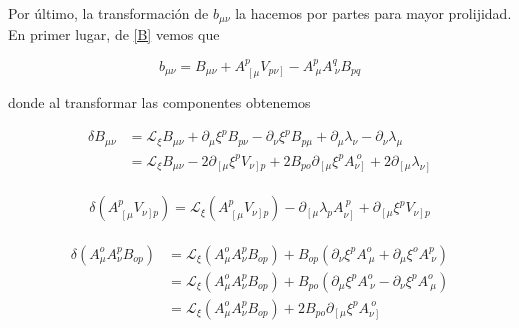 \documentclass{article}
\numberwithin{equation}{section}
\begin{document}
Por último, la transformación de $ b_{\mu \nu} $ la hacemos por partes para mayor prolijidad. En primer lugar, de \ref{B} vemos que 

\begin{equation}\label{aux0}
b_{\mu \nu} = B_{\mu \nu} + A^p_{\ \left[\mu \right.} V_{\left. p \nu \right]} - A^p_{\ \mu}A^q_{\ \nu} B_{p q}
\end{equation}

donde al transformar las componentes obtenemos

\begin{equation}\label{aux1}
\begin{aligned}
\delta B_{\mu \nu} &= \mathcal{L}_{\xi} B_{\mu \nu} + \partial_{\mu} \xi^p B_{p \nu} - \partial_{\nu} \xi^p B_{p \mu} + \partial_{\mu} \lambda_{\nu} - \partial_{\nu} \lambda_{\mu}\\
&= \mathcal{L}_{\xi} B_{\mu \nu} - 2 \partial_{\left[\mu \right.} \xi^p V_{\left. \nu \right] p} + 2 B_{p o} \partial_{\left[\mu \right.} \xi^p A_{\left. \nu \right]}^{\ o} + 2 \partial_{\left[\mu \right.} \lambda_{\left. \nu \right]}
\end{aligned}
\end{equation}\\

\begin{equation}\label{aux2}
\delta \left( A^p_{\ \left[ \mu\right.} V_{\left.\nu \right] p}\right) = \mathcal{L}_{\xi} \left( A^p_{\ \left[ \mu\right.} V_{\left.\nu \right] p}\right) - \partial_{\left[\mu \right.} \lambda_p A_{\left. \nu \right]}^{\ p} + \partial_{\left[\mu \right.} \xi^p V_{\left. \nu \right] p}
\end{equation}\\


\begin{equation}\label{aux3}
\begin{aligned}
\delta \left( A^o_{\mu} A^p_{\nu} B_{o p} \right) &= \mathcal{L}_{\xi} \left( A^o_{\mu} A^p_{\nu} B_{o p} \right) + B_{o p} \left( \partial_{\nu} \xi^p A^o_{\ \mu} + \partial_{\mu} \xi^o A^p_{\ \nu}  \right)\\
&= \mathcal{L}_{\xi} \left( A^o_{\mu} A^p_{\nu} B_{o p} \right) + B_{p o} \left( \partial_{\mu} \xi^p A^o_{\ \nu} - \partial_{\nu} \xi^p A^o_{\ \mu}  \right)\\
&= \mathcal{L}_{\xi} \left( A^o_{\mu} A^p_{\nu} B_{o p} \right) + 2 B_{p o} \partial_{\left[\mu \right.} \xi^p A_{\left. \nu \right]}^{\ o}
\end{aligned}
\end{equation}
\end{document}
